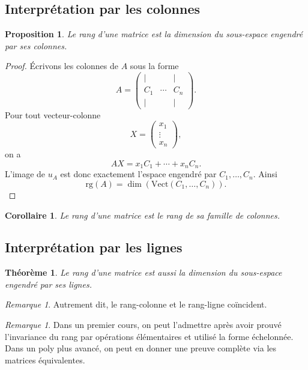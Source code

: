 \documentclass[11pt,a4paper]{article}
\newtheorem{theoreme}[definition]{Théorème}
\newtheorem{proposition}[definition]{Proposition}
\newtheorem{corollaire}[definition]{Corollaire}
\theoremstyle{remark}
\newtheorem{remarque}[definition]{Remarque}
\newcommand{\Vect}{\mathrm{Vect}}
\newcommand{\rg}{\mathrm{rg}}
\begin{document}
\subsection{Interprétation par les colonnes}

\begin{proposition}
Le rang d’une matrice est la dimension du sous-espace engendré par ses colonnes.
\end{proposition}

\begin{proof}
Écrivons les colonnes de \(A\) sous la forme
\[
A=
\begin{pmatrix}
| & & |\\
C_1 & \cdots & C_n\\
| & & |
\end{pmatrix}.
\]
Pour tout vecteur-colonne
\[
X=
\begin{pmatrix}
x_1\\
\vdots\\
x_n
\end{pmatrix},
\]
on a
\[
AX=x_1C_1+\cdots+x_nC_n.
\]
L’image de \(u_A\) est donc exactement l’espace engendré par \(C_1,\dots,C_n\). Ainsi
\[
\rg(A)=\dim(\Vect(C_1,\dots,C_n)).
\]
\end{proof}

\begin{corollaire}
Le rang d’une matrice est le rang de sa famille de colonnes.
\end{corollaire}

\subsection{Interprétation par les lignes}

\begin{theoreme}
Le rang d’une matrice est aussi la dimension du sous-espace engendré par ses lignes.
\end{theoreme}

\begin{remarque}
Autrement dit, le rang-colonne et le rang-ligne coïncident.
\end{remarque}

\begin{remarque}
Dans un premier cours, on peut l’admettre après avoir prouvé l’invariance du rang par opérations élémentaires et utilisé la forme échelonnée. Dans un poly plus avancé, on peut en donner une preuve complète via les matrices équivalentes.
\end{remarque}
\end{document}
